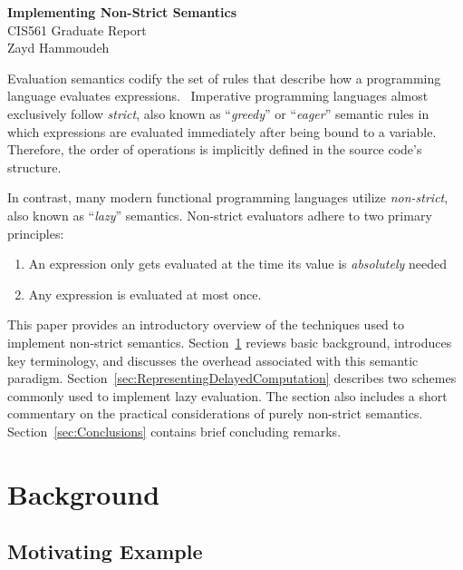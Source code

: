 \documentclass[11pt]{article}
\begin{document}
\begin{center}
  \textbf{\Large Implementing Non-Strict Semantics}\\\vspace{3pt}
  {\large CIS561 Graduate Report}\\\vspace{3pt}
  Zayd Hammoudeh
\end{center}

Evaluation semantics codify the set of rules that describe how a programming language evaluates expressions.~\cite{hoover:Notes}  Imperative programming languages almost exclusively follow \textit{strict}, also known as ``\textit{greedy}'' or ``\textit{eager}'' semantic rules in which expressions are evaluated immediately after being bound to a variable.  Therefore, the order of operations is implicitly defined in the source code's structure.

In contrast, many modern functional programming languages utilize \textit{non-strict}, also known as ``\textit{lazy}'' semantics. Non-strict evaluators adhere to two primary principles:~\cite{Henderson:1976}

\begin{enumerate}
  \item An expression only gets evaluated at the time its value is \textit{absolutely} needed
  \item Any expression is evaluated at most once.
\end{enumerate}

This paper provides an introductory overview of the techniques used to implement non-strict semantics. Section~\ref{sec:Background} reviews basic background, introduces key terminology, and discusses the overhead associated with this semantic paradigm.  Section~\ref{sec:RepresentingDelayedComputation} describes two schemes commonly used to implement lazy evaluation.  The section also includes a short commentary on the practical considerations of purely non-strict semantics.  Section~\ref{sec:Conclusions} contains brief concluding remarks.

\section{Background}\label{sec:Background}

\subsection{Motivating Example}\label{sec:MotivatingExample}
\end{document}
